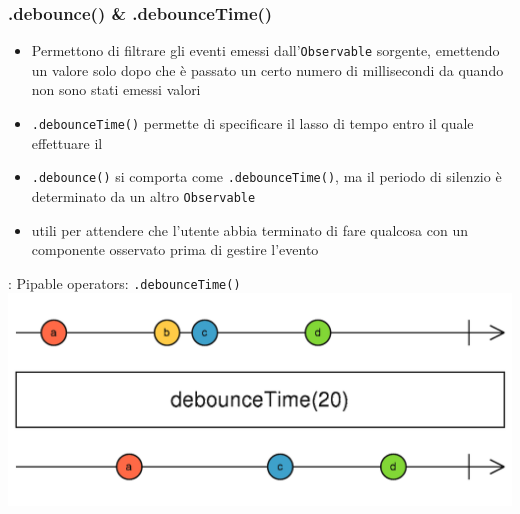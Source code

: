             \subsubsection{.debounce() \& .debounceTime()}\label{subsub:debounce}

            \begin{frame}{\insertsubsectionhead}{}
                \begin{block}{\texttt{\insertsubsubsectionhead}}
                    \begin{itemize}
                        \item
                            Permettono di filtrare gli eventi emessi dall'\texttt{Observable} sorgente, emettendo un valore solo dopo che è passato un certo numero di millisecondi da quando non sono stati emessi valori
                        \item
                            \texttt{.debounceTime()} permette di specificare il lasso di tempo entro il quale effettuare il 
                        \item
                            \texttt{.debounce()} si comporta come \texttt{.debounceTime()}, ma il periodo di silenzio è determinato da un altro \texttt{Observable}
                        \item
                            utili per attendere che l'utente abbia terminato di fare qualcosa con un componente osservato prima di gestire l'evento
                    \end{itemize}
                \end{block}
            \end{frame}

            \begin{frame}[fragile]{\insertsubsectionhead}{: Pipable operators: \texttt{.debounceTime()}}
                \includegraphics[width=\linewidth]{debounceTime}
            \end{frame}

